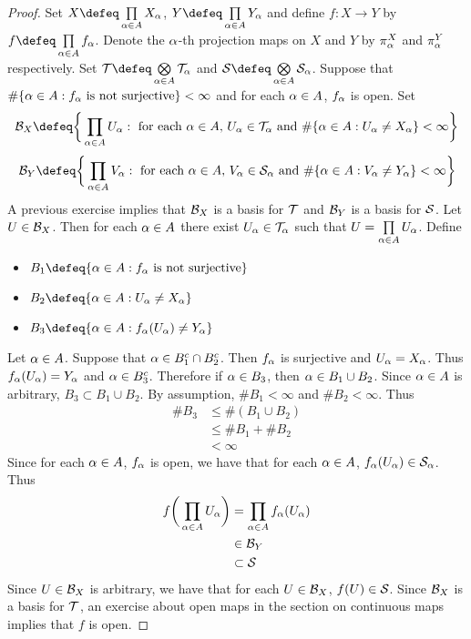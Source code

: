 \documentclass{book}
\begin{document}
	\begin{proof} Set $X \defeq \prod\limits_{\al \in A} X_{\al}$, $Y \defeq \prod\limits_{\al \in A}Y_{\al}$ and define $f: X \rightarrow Y$ by $f \defeq \prod\limits_{\al \in A} f_{\al}$. Denote the $\alpha$-th projection maps on $X$ and $Y$ by $\pi^X_{\alpha}$ and $\pi^Y_{\alpha}$ respectively. Set $\MT \defeq \bigotimes\limits_{\al \in A}\MT_{\al}$ and $\MS \defeq \bigotimes\limits_{\al \in A} \MS_{\al}$. Suppose that $\# \{\alpha \in A: f_{\alpha} \text{ is not surjective}\} < \infty$ and for each $\alpha \in A$, $f_{\alpha}$ is open. Set 
		$$\MB_X \defeq \bigg \{\prod_{\al \in A}U_{\al}: \text{ for each $\al \in A$,  $U_{\al} \in \MT_{\al}$ and $\# \{\al \in A: U_{\al} \neq X_{\al}\} < \infty$} \bigg\}$$
		$$\MB_Y \defeq \bigg \{\prod_{\al \in A}V_{\al}: \text{ for each $\al \in A$,  $V_{\al} \in \MS_{\al}$ and $\# \{\al \in A: V_{\al} \neq Y_{\al}\} < \infty$} \bigg\}$$
		A previous exercise implies that $\mathcal{B}_X$ is a basis for $\mathcal{T}$ and $\mathcal{B}_Y$ is a basis for $\mathcal{S}$. Let $U \in \mathcal{B}_X$. Then for each $\alpha \in A$ there exist $U_{\alpha} \in \mathcal{T}_{\alpha}$ such that $U = \prod\limits_{\alpha \in A} U_{\alpha}$. Define 
		\begin{itemize}
			\item $B_1 \defeq \{\al \in A: f_{\al} \text{ is not surjective}\}$ 
			\item $B_2 \defeq \{\al \in A: U_{\al} \neq X_{\al}\}$ 
			\item $B_3 \defeq \{\al \in A: f_{\al}(U_{\al}) \neq Y_{\al}\}$
		\end{itemize}
		Let $\alpha \in A$. Suppose that $\alpha \in B_1^c \cap B_2^c$. Then $f_{\alpha}$ is surjective and $U_{\alpha} = X_{\alpha}$. Thus $f_{\alpha}(U_{\alpha}) = Y_{\alpha}$ and $\alpha \in B_3^c$. Therefore if $\alpha \in B_3$, then $\alpha \in B_1 \cup B_2$. Since $\alpha \in A$ is arbitrary, $B_3 \subset B_1 \cup B_2$. By assumption, $\# B_1 < \infty$ and $\# B_2 < \infty$. Thus 
		\begin{align*}
			\# B_3
			& \leq \# (B_1 \cup B_2) \\
			& \leq \# B_1 + \# B_2 \\
			& < \infty
		\end{align*}
		Since for each $\alpha \in A$, $f_{\alpha}$ is open, we have that for each $\alpha \in A$, $f_{\alpha}(U_{\alpha}) \in \mathcal{S}_{\alpha}$. Thus
		\begin{align*}
			f\bigg( \prod\limits_{\alpha \in A} U_{\alpha}\bigg) 
			& = \prod_{\alpha \in A} f_{\alpha}(U_{\alpha}) \\
			& \in \mathcal{B}_{Y} \\
			& \subset \mathcal{S}
		\end{align*}
		Since $U \in \mathcal{B}_X$ is arbitrary, we have that for each $U \in \mathcal{B}_X$, $f(U) \in \mathcal{S}$. Since $\mathcal{B}_X$ is a basis for $\mathcal{T}$, an exercise about open maps in the section on continuous maps implies that $f$ is open.
	\end{proof}
\end{document}
